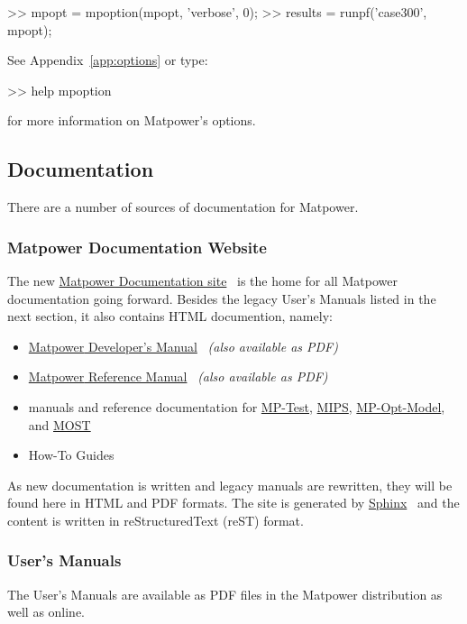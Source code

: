 \documentclass[12pt]{article}
\newcommand{\matpower}[0]{{\sc Matpower}}
\newcommand{\mptest}[0]{{MP-Test}}
\newcommand{\mptesturl}[0]{https://github.com/MATPOWER/mptest}
\newcommand{\mptestlink}[0]{\href{\mptesturl}{\mptest{}}}
\newcommand{\mips}[0]{{MIPS}}
\newcommand{\mipsurl}[0]{https://github.com/MATPOWER/mips}
\newcommand{\mipslink}[0]{\href{\mipsurl}{\mips{}}}
\newcommand{\mpom}[0]{\mbox{MP-Opt-Model}}
\newcommand{\mpomurl}[0]{https://github.com/MATPOWER/mp-opt-model}
\newcommand{\mpomlink}[0]{\href{\mpomurl}{\mpom{}}}
\newcommand{\most}[0]{{MOST}}
\newcommand{\mosturl}[0]{https://github.com/MATPOWER/most}
\newcommand{\mostlink}[0]{\href{\mosturl}{\most{}}}
\newcommand{\mdmurl}[0]{https://matpower.org/doc/dev-manual}
\newcommand{\mdm}[0]{\href{\mdmurl}{\matpower{} Developer's Manual}}
\newcommand{\mrmurl}[0]{https://matpower.org/doc/ref-manual}
\newcommand{\mrm}[0]{\href{\mrmurl}{\matpower{} Reference Manual}}
\numberwithin{equation}{section}
\numberwithin{table}{section}
\numberwithin{figure}{section}
\begin{document}
\begin{Code}
>> mpopt = mpoption(mpopt, 'verbose', 0);
>> results = runpf('case300', mpopt);
\end{Code}

See Appendix~\ref{app:options} or type:
\begin{Code}
>> help mpoption
\end{Code}
for more information on \matpower{}'s options.


\subsection{Documentation}
\label{sec:documentation}

There are a number of sources of documentation for \matpower{}.

\subsubsection{\matpower{} Documentation Website}

The new \href{https://matpower.org/doc/}{\matpower{} Documentation site}~\cite{mp_docs} is the home for all \matpower{} documentation going forward. Besides the legacy User's Manuals listed in the next section, it also contains HTML documention, namely:
\begin{itemize}
\item \mdm{}~\cite{dev_manual} \emph{(also available as PDF)}
\item \mrm{}~\cite{ref_manual} \emph{(also available as PDF)}
\item manuals and reference documentation for \mptestlink{}, \mipslink{}, \mpomlink{}, and \mostlink{}
\item How-To Guides
\end{itemize}

As new documentation is written and legacy manuals are rewritten, they will be found here in HTML and PDF formats. The site is generated by \href{https://www.sphinx-doc.org/}{Sphinx}~\cite{sphinx} and the content is written in reStructuredText (reST) format.

\subsubsection{User's Manuals}

The User's Manuals are available as PDF files in the \matpower{} distribution as well as online.
\end{document}
